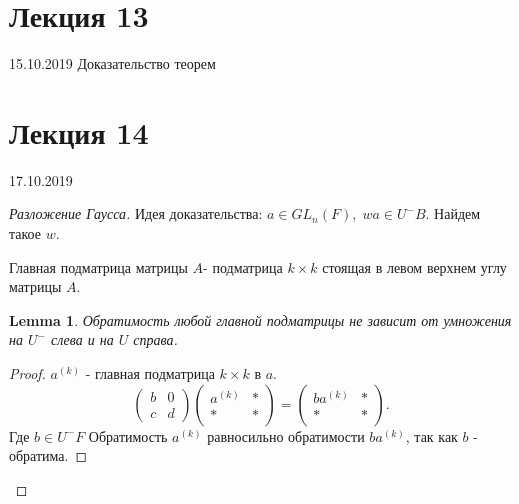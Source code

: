 \documentclass[11pt]{book}
\theoremstyle{definition}
\theoremstyle{plain}
\theoremstyle{plain}
\newtheorem*{lm}{Lemma}
\theoremstyle{definition}
\theoremstyle{remark}
\begin{document}
\section{Лекция 13}
15.10.2019
Доказательство теорем

\section{Лекция 14}
17.10.2019
\begin{proof}[Разложение Гаусса]
    Идея доказательства: $a \in  GL_n(F), \; wa \in  U^- B$. Найдем такое $w$.\\
    \begin{defn}
        Главная подматрица матрицы $A$- подматрица $k \times k$ стоящая в левом верхнем углу матрицы $A$.
    \end{defn}

    \begin{lm}
        Обратимость любой главной подматрицы не зависит от умножения на  $U^-$ слева и на  $U$ справа.
    \end{lm}
    \begin{proof}
	$a^{(k)}$ - главная подматрица $k \times k$ в $a$.
	 \[
	\left ( 
	\begin{array}{cc}
	    b&0\\
	    c&d
	\end{array}
	\right )
	\left ( 
	\begin{array}{cc}
	    a^{(k)}&* \\
	    *& *
	\end{array}
	\right )=
	\left ( 
	\begin{array}{cc}
	    ba^{(k)}&*\\
	    *&*
	\end{array}
	\right )
	.\] 
	$\mbox{Где } b \in  U^- F$ 
	Обратимость $a^{(k)} $ равносильно обратимости $ba^{(k)}$, так как $b$ - обратима.
    \end{proof}


\end{proof}
\end{document}
